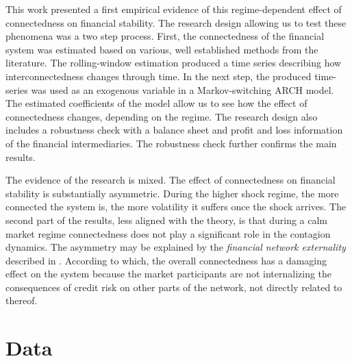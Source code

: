 \documentclass[12pt]{article}
\begin{document}
This work presented a first empirical evidence of this regime-dependent effect of connectedness on financial stability. The research design allowing us to test these phenomena was a two step process. First, the connectedness of the financial system was estimated based on various, well established methods from the literature. The rolling-window estimation produced a time series describing how interconnectedness changes through time. In the next step, the produced time-series was used as an exogenous variable in a Markov-switching ARCH model. The estimated coefficients of the model allow us to see how the effect of connectedness changes, depending on the regime. The research design also includes a robustness check with a balance sheet and profit and loss information of the financial intermediaries. The robustness check further confirms the main results.

The evidence of the research is mixed. The effect of connectedness on financial stability is substantially asymmetric. During the higher shock regime, the more connected the system is, the more volatility it suffers once the shock arrives. The second part of the results, less aligned with the theory, is that during a calm market regime connectedness does not play a significant role in the contagion dynamics. The asymmetry may be explained by the \textit{financial network externality} described in \citet{acemoglu15}. According to which, the overall connectedness has a damaging effect on the system because the market participants are not internalizing the consequences of credit risk on other parts of the network, not directly related to thereof.



\newpage

\appendix

\section{Data}\label{appendix:data}
\end{document}
